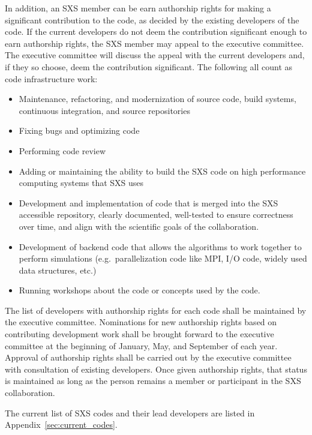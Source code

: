 \documentclass[12pt]{article}
\begin{document}
In addition, an SXS member can be earn authorship rights for making a
significant contribution to the code, as decided by the existing
developers of the code.  If the current developers do not deem the
contribution significant enough to earn authorship rights, the SXS
member may appeal to the executive committee.  The executive committee
will discuss the appeal with the current developers and, if they so
choose, deem the contribution significant. 
The following all count as code infrastructure work:
\begin{itemize}
  \setlength\itemsep{-0.25em}
\item Maintenance, refactoring, and modernization of source code,
  build systems, continuous integration, and source repositories
\item Fixing bugs and optimizing code
\item Performing code review
\item Adding or maintaining the ability to build the SXS code on
  high performance computing systems that SXS uses
\item Development and implementation of code that is
  merged into the SXS accessible repository, clearly documented,
  well-tested to ensure correctness over time, and align with the
  scientific goals of the collaboration.
\item Development of backend code that allows the algorithms to work
  together to perform simulations (e.g.~parallelization code like MPI,
  I/O code, widely used data structures, etc.)
\item Running workshops about the code or concepts used by the code.
\end{itemize}

The list of developers with authorship rights for each code shall be
maintained by the executive committee.  Nominations for new authorship
rights based on contributing development work shall be brought forward
to the executive committee at the beginning of January, May, and
September of each year. Approval of authorship rights shall be carried
out by the executive committee with consultation of existing
developers. Once given authorship rights, that status is maintained as
long as the person remains a member or participant in the SXS
collaboration.

The current list of SXS codes and their lead developers are listed in
Appendix~\ref{sec:current_codes}.
\end{document}
